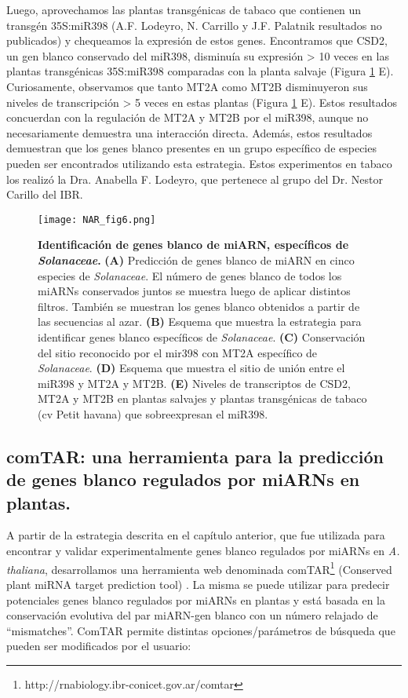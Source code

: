 Luego, aprovechamos las plantas transgénicas de tabaco que contienen un transgén 35S:miR398 (A.F. Lodeyro, N. Carrillo y J.F. Palatnik resultados no publicados) y chequeamos la expresión de estos genes.
Encontramos que CSD2, un gen blanco conservado del miR398, disminuía su expresión > 10 veces en las plantas transgénicas 35S:miR398 comparadas con la planta salvaje (Figura \ref{fig:NAR_fig6} E).
Curiosamente, observamos que tanto MT2A como MT2B  disminuyeron sus niveles de transcripción > 5 veces en estas plantas (Figura \ref{fig:NAR_fig6} E).
Estos resultados concuerdan con la regulación de MT2A y MT2B por el miR398, aunque no necesariamente demuestra una interacción directa.
Además, estos resultados demuestran que los genes blanco presentes en un grupo específico de especies pueden ser encontrados utilizando esta estrategia.
Estos experimentos en tabaco los realizó la Dra. Anabella F. Lodeyro, que pertenece al grupo del Dr. Nestor Carillo del IBR.

\begin{figure}[htbp!] 
    \centering    
    \texttt{[image: NAR\_fig6.png]}
    \caption[Identificación de genes blanco de miARN, específicos de \textit{Solanaceae}]{
    \textbf{Identificación de genes blanco de miARN, específicos de \textit{Solanaceae}.}
    \textbf{(A)} Predicción de genes blanco de miARN en cinco especies de \textit{Solanaceae}.
    El número de genes blanco de todos los miARNs conservados juntos se muestra luego de aplicar distintos filtros.
    También se muestran los genes blanco obtenidos a partir de las secuencias al azar.
    \textbf{(B)} Esquema que muestra la estrategia para identificar genes blanco específicos de \textit{Solanaceae}.
    \textbf{(C)} Conservación del sitio reconocido por el mir398 con MT2A específico de \textit{Solanaceae}.
    \textbf{(D)} Esquema que muestra el sitio de unión entre el miR398 y MT2A y MT2B.
    \textbf{(E)} Niveles de transcriptos de CSD2, MT2A y MT2B en plantas salvajes y plantas transgénicas de tabaco (cv Petit havana) que sobreexpresan el miR398.  }
    \label{fig:NAR_fig6}
\end{figure}


\subsection{comTAR: una herramienta para la predicción de genes blanco regulados por miARNs en plantas.} 

A partir de la estrategia descrita en el capítulo anterior, que fue utilizada para encontrar y validar experimentalmente genes blanco regulados por miARNs en \textit{A. thaliana}, desarrollamos una herramienta web denominada comTAR\footnote{http://rnabiology.ibr-conicet.gov.ar/comtar} (Conserved plant miRNA target prediction tool) \citep{Chorostecki2014}.
La misma se puede utilizar para predecir potenciales genes blanco regulados por miARNs en plantas y está basada en la conservación evolutiva del par miARN-gen blanco con un número relajado de ``mismatches''.
ComTAR permite distintas opciones/parámetros de búsqueda que pueden ser modificados por el usuario:

